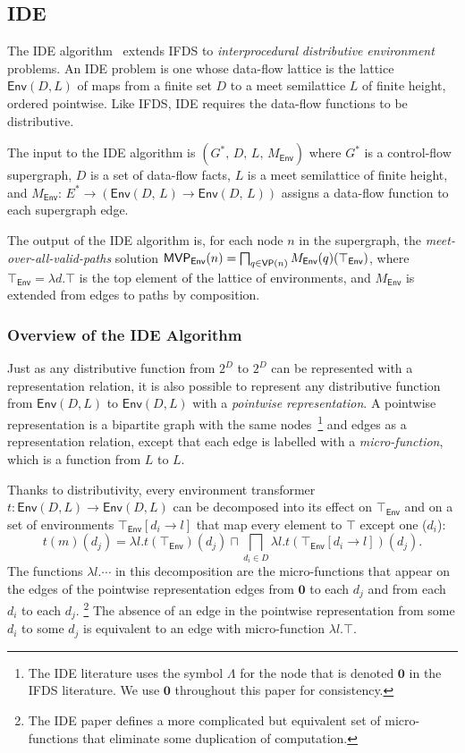 \subsection{IDE}\label{sec:bgide}

The IDE algorithm~\cite{sagiv1996precise} extends IFDS to
\textit{interprocedural} \textit{distributive} \textit{environment}
problems. An IDE problem is one whose data-flow
lattice is the lattice $\textsf{Env}(D,L)$ of maps from a finite set $D$ to a meet semilattice
$L$ of finite height, ordered pointwise. Like IFDS, IDE requires the data-flow functions to be distributive.

The input to the IDE algorithm is
  $(G^*,\,D,\,L,\,M_\textsf{Env})$
where $G^*$ is a control-flow supergraph,
$D$ is a set of data-flow facts,
$L$ is a meet semilattice of finite height,
and $M_\textsf{Env}:\,E^*\to(\textsf{Env}(D,\,L)\to \textsf{Env}(D,\,L))$ assigns a data-flow function
to each supergraph edge.

The output of the IDE algorithm is, for each node $n$ in the supergraph,
the \textit{meet-over-all-valid-paths} solution
$\textsf{MVP}_{\textsf{Env}}(n)=\bigsqcap_{q\in\textsf{VP}(n)}M_\textsf{Env}(q)(\top_\textsf{Env})$,
where $\top_\textsf{Env} = \lambda d.\top$ is the top element of the lattice of environments,
and $M_\textsf{Env}$ is extended from edges to paths by composition.

\subsubsection{Overview of the IDE Algorithm}\label{sec:ideoverview}
Just as any distributive function from $2^D$ to $2^D$ can be represented with a
representation relation, it is also possible to represent any distributive function from
$\textsf{Env}(D,L)$
to
$\textsf{Env}(D,L)$
with a \textit{pointwise representation}. A pointwise representation is a bipartite graph
with the same nodes~\footnote{The IDE literature uses the symbol $\Lambda$ for the node that
    is denoted $\mathbf0$ in the IFDS literature. We use $\mathbf0$ throughout this paper for consistency.}
and edges as a representation relation, except that each edge is labelled
with a \textit{micro-function}, which is a function from $L$ to $L$. 

Thanks to distributivity, every environment transformer 
$t : \textsf{Env}(D,L) \to \textsf{Env}(D,L)$
can be decomposed into its effect on $\top_{\textsf{Env}}$ and on a set of environments $\top_{\textsf{Env}}[d_i\to l]$
that map every element to $\top$ except one ($d_i$):
\[
    t(m)(d_j) = \lambda l. t(\top_{\textsf{Env}})(d_j) \sqcap \bigsqcap_{d_i\in D} \lambda l. t(\top_{\textsf{Env}}[d_i\to l])(d_j).
\]
The functions $\lambda l. \cdots$ in this decomposition are the micro-functions that
appear on the edges of the pointwise representation edges from $\mathbf0$ to each $d_j$ and from
each $d_i$ to each $d_j$.%
\footnote{The IDE paper defines a more complicated but equivalent set of micro-functions
that eliminate some duplication of computation.}
The absence of an edge in the pointwise representation from some $d_i$ to some $d_j$ is
equivalent to an edge with micro-function $\lambda l.\top$.

